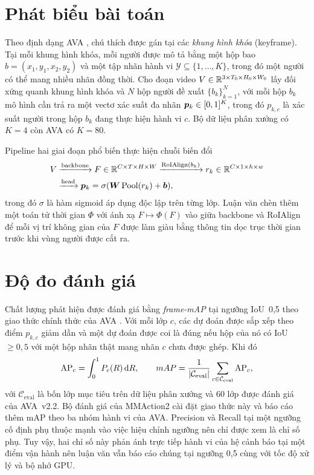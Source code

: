 \section{Phát biểu bài toán}
\label{sec:formulation}

Theo định dạng AVA \cite{gu2018ava}, chú thích được gán tại các \emph{khung hình khóa} (keyframe). Tại mỗi khung hình khóa, mỗi người được mô tả bằng một hộp bao $b = (x_1, y_1, x_2, y_2)$ và một tập nhãn hành vi $\mathcal{Y} \subseteq \{1, \dots, K\}$, trong đó một người có thể mang nhiều nhãn đồng thời. Cho đoạn video $V \in \mathbb{R}^{3 \times T_0 \times H_0 \times W_0}$ lấy đối xứng quanh khung hình khóa và $N$ hộp người đề xuất $\{b_k\}_{k=1}^{N}$, với mỗi hộp $b_k$ mô hình cần trả ra một vectơ xác suất đa nhãn $\bm{p}_k \in [0,1]^K$, trong đó $p_{k,c}$ là xác suất người trong hộp $b_k$ đang thực hiện hành vi $c$. Bộ dữ liệu phân xưởng có $K = 4$ còn AVA có $K = 80$.

Pipeline hai giai đoạn phổ biến \cite{gu2018ava,feichtenhofer2019slowfast,mmaction2} thực hiện chuỗi biến đổi
\begin{equation}
\begin{aligned}
V &\xrightarrow{\text{backbone}} F \in \mathbb{R}^{C \times T \times H \times W}
  \xrightarrow{\text{RoIAlign}(b_k)} r_k \in \mathbb{R}^{C \times 1 \times h \times w}\\
  &\xrightarrow{\text{head}} \bm{p}_k = \sigma(\bm{W} \operatorname{Pool}(r_k) + \bm{b}),
\end{aligned}
\label{eq:pipeline}
\end{equation}
trong đó $\sigma$ là hàm sigmoid áp dụng độc lập trên từng lớp. Luận văn chèn thêm một toán tử thời gian $\Phi$ với ánh xạ $F \mapsto \Phi(F)$ vào giữa backbone và RoIAlign để mỗi vị trí không gian của $F$ được làm giàu bằng thông tin dọc trục thời gian trước khi vùng người được cắt ra.

\section{Độ đo đánh giá}
\label{sec:metric}

Chất lượng phát hiện được đánh giá bằng \emph{frame-mAP} tại ngưỡng IoU~0,5 theo giao thức chính thức của AVA \cite{gu2018ava}. Với mỗi lớp $c$, các dự đoán được sắp xếp theo điểm $p_{k,c}$ giảm dần và một dự đoán được coi là đúng nếu hộp của nó có IoU $\geq 0{,}5$ với một hộp nhãn thật mang nhãn $c$ chưa được ghép. Khi đó
\begin{equation}
\mathrm{AP}_c = \int_0^1 P_c(R)\,\mathrm{d}R, \qquad
mAP = \frac{1}{|\mathcal{C}_{\text{eval}}|} \sum_{c \in \mathcal{C}_{\text{eval}}} \mathrm{AP}_c,
\label{eq:map}
\end{equation}
với $\mathcal{C}_{\text{eval}}$ là bốn lớp mục tiêu trên dữ liệu phân xưởng và 60 lớp được đánh giá của AVA~v2.2. Bộ đánh giá  của MMAction2 \cite{mmaction2} cài đặt giao thức này và báo cáo thêm mAP theo ba nhóm hành vi của AVA. Precision và Recall tại một ngưỡng cố định phụ thuộc mạnh vào việc hiệu chỉnh ngưỡng nên chỉ được xem là chỉ số phụ. Tuy vậy, hai chỉ số này phản ánh trực tiếp hành vi của hệ cảnh báo tại một điểm vận hành nên luận văn vẫn báo cáo chúng tại ngưỡng 0,5 cùng với tốc độ xử lý và bộ nhớ GPU.

